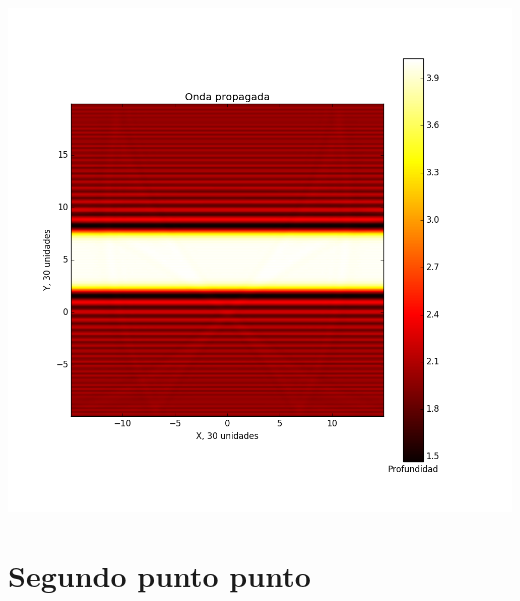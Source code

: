 \documentclass{article}
\begin{document}
\begin{center}
\includegraphics[scale=0.60]{t_f.png}
\end{center}

\section{Segundo punto punto}
\end{document}
